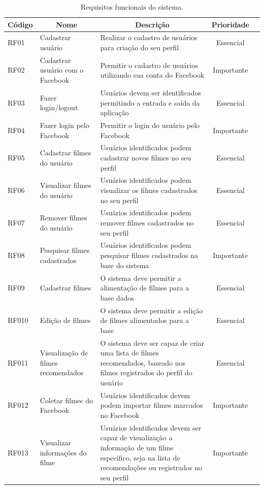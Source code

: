 \begin{table}[H]
	\label{tab:req-funcionais}
	\centering
	\caption{Requisitos funcionais do sistema.}
	\def\arraystretch{1.2} %
	\begin{tabular}{|m{1.2cm} | m{3cm} | m{7.2cm}| c | m{1.9cm}}
		\hline
		
		\multicolumn{1}{|c|}{\bfseries Código} & \multicolumn{1}{c|}{\bfseries Nome} & \multicolumn{1}{c|}{\bfseries Descrição} & \multicolumn{1}{c|}{\bfseries Prioridade} \\ \hline
		RF01	& Cadastrar usuário	& Realizar o cadastro de usuários para criação do seu perfil	& Essencial \\ \hline
		RF02	& Cadastrar usuário com o Facebook	& Permitir o cadastro de usuários utilizando sua conta do Facebook	& Importante \\ \hline
		RF03	& Fazer login/logout	& Usuários devem ser identificados permitindo a entrada e saída da aplicação	& Essencial \\ \hline
		RF04	& Fazer login pelo Facebook	& Permitir o login do usuário pelo Facebook	& Importante \\ \hline
		RF05	& Cadastrar filmes do usuário	& Usuários identificados podem cadastrar novos filmes no seu perfil	& Essencial \\ \hline
		RF06	& Visualizar filmes do usuário	& Usuários identificados podem visualizar os filmes cadastrados no seu perfil	& Essencial \\ \hline
		RF07	& Remover filmes do usuário	& Usuários identificados podem remover filmes cadastrados no seu perfil	& Essencial \\ \hline
		RF08	& Pesquisar filmes cadastrados	& Usuários identificados podem pesquisar filmes cadastrados na base do sistema	& Importante \\ \hline
		RF09	& Cadastrar filmes	& O sistema deve permitir a alimentação de filmes para a base dados	& Essencial \\ \hline
		RF010	& Edição de filmes	& O sistema deve permitir a edição de filmes alimentados para a base	& Essencial \\ \hline
		RF011	& Visualização de filmes recomendados	& O sistema deve ser capaz de criar uma lista de filmes recomendados, baseado nos filmes registrados do perfil do usuário	& Essencial \\ \hline
		RF012	& Coletar filmes do Facebook	& Usuários identificados devem podem importar filmes marcados no Facebook	& Importante \\ \hline
		RF013	& Visualizar informações do filme	& Usuários identificados devem ser capaz de visualização a informação de um filme específico, seja na lista de recomendações ou registrados no seu perfil	& Importante \\ \hline
	\end{tabular}
\end{table}

